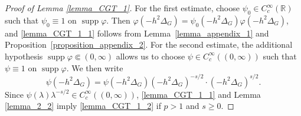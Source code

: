 \documentclass[10pt%
]{amsart}
\numberwithin{equation}{section}
\newcommand{\R}{\mathbb{R}}
\theoremstyle{definition}
\def\supp{\mathop{\mathrm{supp}}\nolimits}
\begin{document}

\begin{proof}[Proof of Lemma \ref{lemma_CGT_1}]
	For the first estimate, choose $\psi_0\in C_c^\infty(\R)$ such that $\psi_0\equiv1$ on $\supp\varphi$. Then $\varphi(-h^2\Delta_G)=\psi_0(-h^2\Delta_G)\varphi(-h^2\Delta_G)$, and \eqref{lemma_CGT_1_1} follows from Lemma~\ref{lemma_appendix_1} and Proposition~\ref{proposition_appendix_2}. For the second estimate, the additional hypothesis $\supp\varphi\Subset(0,\infty)$ allows us to choose $\psi\in C_c^\infty((0,\infty))$ such that $\psi\equiv1$ on $\supp\varphi$. We then write
	$$
	\psi(-h^2\Delta_G)=\psi(-h^2\Delta_G)(-h^2\Delta_G)^{-s/2}\cdot (-h^2\Delta_G)^{s/2}.
	$$
	Since $\psi(\lambda)\lambda^{-s/2}\in C_c^\infty((0,\infty))$, \eqref{lemma_CGT_1_1} and Lemma \ref{lemma_2_2} imply \eqref{lemma_CGT_1_2} 
	if  $p>1$ and $s\ge0$. \end{proof}
\end{document}
